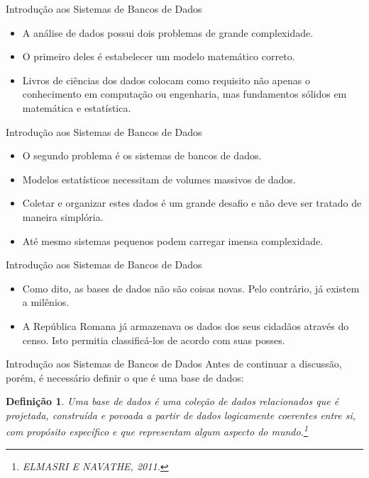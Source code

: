 \documentclass[11pt]{beamer}
\newtheorem{mydef}{Definição}
\begin{document}
\begin{frame}{Introdução aos Sistemas de Bancos de Dados}
    \begin{itemize}
        \item A análise de dados possui dois problemas de grande complexidade.
        \item O primeiro deles é estabelecer um modelo matemático correto.
        \item Livros de ciências dos dados colocam como requisito não apenas o conhecimento em computação ou engenharia, mas fundamentos sólidos em matemática e estatística.
    \end{itemize}
\end{frame}

\begin{frame}{Introdução aos Sistemas de Bancos de Dados}
    \begin{itemize}
        \item O segundo problema é os sistemas de bancos de dados.
        \item Modelos estatísticos necessitam de volumes massivos de dados.
        \item Coletar e organizar estes dados é um grande desafio e não deve ser tratado de maneira simplória.
        \item Até mesmo sistemas pequenos podem carregar imensa complexidade.
    \end{itemize}
\end{frame}

\begin{frame}{Introdução aos Sistemas de Bancos de Dados}
    \begin{itemize}
        \item Como dito, as bases de dados não são coisas novas. Pelo contrário, já existem a milênios.
        \item A República Romana já armazenava os dados dos seus cidadãos através do censo. Isto permitia classificá-los de acordo com suas posses.
    \end{itemize}
\end{frame}

\begin{frame}{Introdução aos Sistemas de Bancos de Dados}
    Antes de continuar a discussão, porém, é necessário definir o que é uma base de dados:
    \begin{mydef}
        Uma base de dados é uma coleção de dados relacionados que é projetada, construída e povoada a partir de dados logicamente coerentes entre si, com propósito específico e que representam algum aspecto do mundo.\footnote{ELMASRI E NAVATHE, 2011.}
    \end{mydef}
\end{frame}
\end{document}
